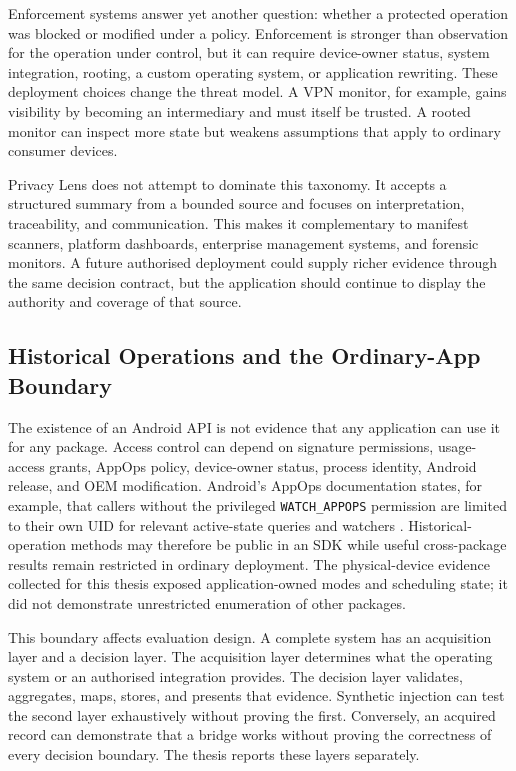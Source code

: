 Enforcement systems answer yet another question: whether a protected operation was blocked or modified under a policy. Enforcement is stronger than observation for the operation under control, but it can require device-owner status, system integration, rooting, a custom operating system, or application rewriting. These deployment choices change the threat model. A VPN monitor, for example, gains visibility by becoming an intermediary and must itself be trusted. A rooted monitor can inspect more state but weakens assumptions that apply to ordinary consumer devices.

Privacy Lens does not attempt to dominate this taxonomy. It accepts a structured summary from a bounded source and focuses on interpretation, traceability, and communication. This makes it complementary to manifest scanners, platform dashboards, enterprise management systems, and forensic monitors. A future authorised deployment could supply richer evidence through the same decision contract, but the application should continue to display the authority and coverage of that source.

\subsection{Historical Operations and the Ordinary-App Boundary}

The existence of an Android API is not evidence that any application can use it for any package. Access control can depend on signature permissions, usage-access grants, AppOps policy, device-owner status, process identity, Android release, and OEM modification. Android's AppOps documentation states, for example, that callers without the privileged \texttt{WATCH\_APPOPS} permission are limited to their own UID for relevant active-state queries and watchers \cite{androidAppOps}. Historical-operation methods may therefore be public in an SDK while useful cross-package results remain restricted in ordinary deployment. The physical-device evidence collected for this thesis exposed application-owned modes and scheduling state; it did not demonstrate unrestricted enumeration of other packages.

This boundary affects evaluation design. A complete system has an acquisition layer and a decision layer. The acquisition layer determines what the operating system or an authorised integration provides. The decision layer validates, aggregates, maps, stores, and presents that evidence. Synthetic injection can test the second layer exhaustively without proving the first. Conversely, an acquired record can demonstrate that a bridge works without proving the correctness of every decision boundary. The thesis reports these layers separately.

